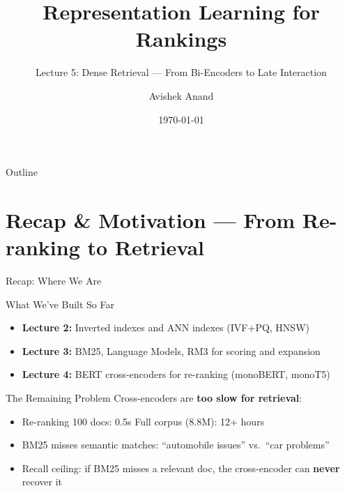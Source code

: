 \documentclass[aspectratio=169]{beamer}
\title[Dense Retrieval]{Representation Learning for Rankings}
\subtitle{Lecture 5: Dense Retrieval --- From Bi-Encoders to Late Interaction}
\author{Avishek Anand}
\institute{Information Retrieval}
\date{\today}
\begin{document}
\begin{frame}
\titlepage
\end{frame}

\begin{frame}{Outline}
\tableofcontents
\end{frame}

\section{Recap \& Motivation --- From Re-ranking to Retrieval}

\begin{frame}[plain]
\sectionpage
\end{frame}

\begin{frame}{Recap: Where We Are}
\begin{block}{What We've Built So Far}
\begin{itemize}
    \item \textbf{Lecture 2:} Inverted indexes and ANN indexes (IVF+PQ, HNSW)
    \item \textbf{Lecture 3:} BM25, Language Models, RM3 for scoring and expansion
    \item \textbf{Lecture 4:} BERT cross-encoders for re-ranking (monoBERT, monoT5)
\end{itemize}
\end{block}

\vspace{1em}

\begin{alertblock}{The Remaining Problem}
Cross-encoders are \textbf{too slow for retrieval}:
\begin{itemize}
    \item Re-ranking 100 docs: 0.5s \textcolor{green}{\checkmark} \quad Full corpus (8.8M): 12+ hours \textcolor{red}{}
    \item BM25 misses semantic matches: ``automobile issues'' vs.\ ``car problems''
    \item Recall ceiling: if BM25 misses a relevant doc, the cross-encoder can \textbf{never} recover it
\end{itemize}
\end{alertblock}
\end{frame}
\end{document}
